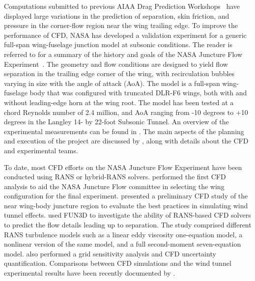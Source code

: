 \documentclass{ctr}
\begin{document}
Computations submitted to previous AIAA Drag Prediction
Workshops~\citep{Vassberg2008} have displayed large variations in the
prediction of separation, skin friction, and pressure in the
corner-flow region near the wing trailing edge. To improve the
performance of CFD, NASA has developed a validation experiment for a
generic full-span wing-fuselage junction model at subsonic
conditions. The reader is referred to \citet{Rumsey2019} for a summary
of the history and goals of the NASA Juncture Flow
Experiment~\citep[see also][]{Rumsey2016a, Rumsey2016b}. The geometry
and flow conditions are designed to yield flow separation in the
trailing edge corner of the wing, with recirculation bubbles varying
in size with the angle of attack (AoA). The model is a full-span
wing-fuselage body that was configured with truncated DLR-F6 wings,
both with and without leading-edge horn at the wing root. The model
has been tested at a chord Reynolds number of 2.4 million, and
AoA ranging from -10 degrees to +10 degrees in the Langley 14- by
22-foot Subsonic Tunnel. An overview of the experimental measurements
can be found in \citet{Kegerise2019}. The main aspects of the planning
and execution of the project are discussed by \citet{Rumsey2018},
along with details about the CFD and experimental teams.

To date, most CFD efforts on the NASA Juncture Flow Experiment have
been conducted using RANS or hybrid-RANS solvers.  \citet{Lee2017}
performed the first CFD analysis to aid the NASA Juncture Flow
committee in selecting the wing configuration for the final
experiment. \citet{Lee2018} presented a preliminary CFD study of the
near wing-body juncture region to evaluate the best practices in
simulating wind tunnel effects.  \citet{Rumsey2019} used FUN3D to
investigate the ability of RANS-based CFD solvers to predict the flow
details leading up to separation. The study comprised different RANS
turbulence models such as a linear eddy viscosity one-equation model,
a nonlinear version of the same model, and a full second-moment
seven-equation model. \citet{Rumsey2019} also performed a grid
sensitivity analysis and CFD uncertainty quantification. Comparisons
between CFD simulations and the wind tunnel experimental results have
been recently documented by \citet{Lee2019}.
\end{document}
